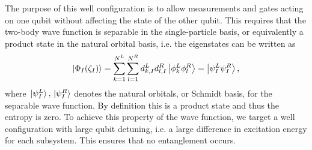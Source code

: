 \documentclass[twocolumn,superscriptaddress,unsortedaddress,
 amsmath,amssymb,
 aps,
]{revtex4-2}
\begin{document}
        The purpose of this well configuration is to allow measurements and gates acting on one qubit without affecting the state of the other qubit. This requires that the two-body wave function is separable in the single-particle basis, or equivalently a product state in the natural orbital basis, i.e. the eigenstates can be written as
        \begin{align*}
            \ket{\Phi_I(\zeta_I)}
            = \sum_{k = 1}^{N^L} \sum_{l = 1}^{N^R}
            d^L_{k, I} d^{R}_{l, I}
            \ket{\phi^L_k \phi^R_l}
            = \ket{\psi^L_I \psi^{R}_I},
        \end{align*}
        where $\ket*{\psi^L_I}, \ket*{\psi^R_I}$ denotes the natural orbitals, or
        Schmidt basis, for the separable wave function. By definition this is a product state and thus the entropy is zero. To achieve this property of the wave function, we target a well configuration with large qubit detuning, i.e. a large difference in excitation energy for each subsystem. This ensures that no entanglement occurs.  %
\end{document}
